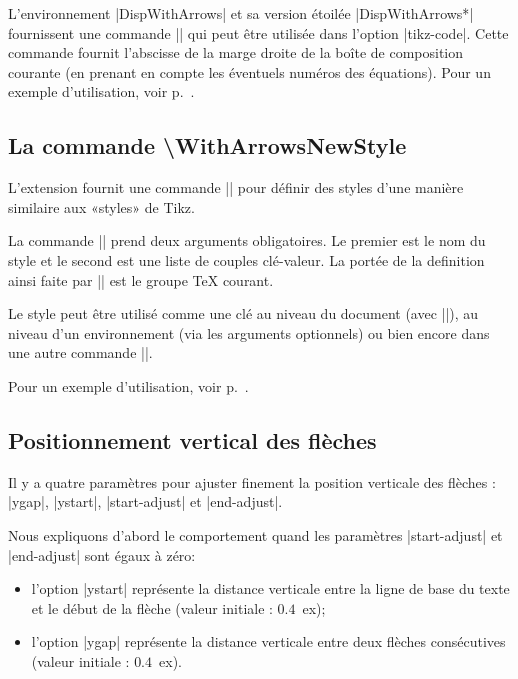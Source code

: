 \documentclass[dvipsnames]{article}%
\begin{document}
\begin{WithArrows}
\begin{WithArrows}[rr]
\bigskip
L'environnement |{DispWithArrows}| et sa version étoilée |{DispWithArrows*}| fournissent une commande
|\WithArrowsRightX| qui peut être utilisée dans l'option |tikz-code|. Cette commande fournit
l'abscisse de la marge droite de la boîte de composition courante (en prenant en compte les éventuels numéros des
équations). Pour un exemple d'utilisation, voir p.~\pageref{example-WithArrowsRightX}.


\bigskip
\subsection{La commande \textbackslash WithArrowsNewStyle}

L'extension  fournit une commande |\WithArrowsNewStyle| pour définir
des styles d'une manière similaire aux «styles» de Tikz.

La commande |\WithArrowsNewStyle| prend deux arguments obligatoires. Le premier est 
le nom du style et le second est une liste de couples clé-valeur. La portée
de la definition ainsi faite par |\WithArrowsNewStyle| est le groupe TeX courant.

Le style peut être utilisé comme une clé au niveau du document (avec |\WithArrowsOptions|), au niveau d'un
environnement (via les arguments optionnels) ou bien encore dans une autre commande |\WithArrowsNewStyle|.

Pour un exemple d'utilisation, voir p.~\pageref{example-WithArrowsRightX}.


\bigskip
\subsection{Positionnement vertical des flèches}

Il y a quatre paramètres pour ajuster finement la position verticale des flèches :
|ygap|, |ystart|, |start-adjust| et |end-adjust|.

\medskip
Nous expliquons d'abord le comportement quand les paramètres |start-adjust| et |end-adjust| sont égaux à
zéro:
\begin{itemize}
\item l'option |ystart| représente la distance verticale entre la ligne de base du
texte et le début de la flèche (valeur initiale : $0.4$~ex);
\item l'option |ygap| représente la distance verticale entre deux flèches consécutives
(valeur initiale : $0.4$~ex).
\end{itemize}



\end{WithArrows}
\end{WithArrows}
\end{document}
